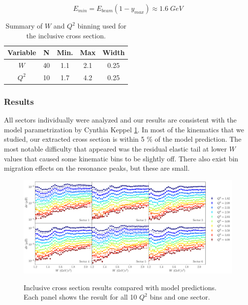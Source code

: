 \begin{equation}
        E_{min} = E_{beam}(1-y_{max}) \approx 1.6 \; GeV
\end{equation}

\begin{table}
  \centering
  \begin{tabular}{c|c|c|c|c}
    Variable & N & Min. & Max & Width \\
    \hline
    $W$   & 40 & 1.1 & 2.1 & 0.25 \\
    $Q^2$ & 10 & 1.7 & 4.2 & 0.25
  \end{tabular}
  \caption{Summary of $W$ and $Q^2$ binning used for the inclusive cross section.}
\end{table}

\subsubsection*{Results}
All sectors individually were analyzed and our results are consistent with the model parametrization by Cynthia Keppel \ref{fig:inclusive_xs}.  In most of the kinematics that we studied, our extracted cross section is within 5 \% of the model prediction.  The most notable difficulty that appeared was the residual elastic tail at lower $W$ values that caused some kinematic bins to be slightly off.  There also exist bin migration effects on the resonance peaks, but these are small.

\begin{figure}
	\begin{center}
		\label{fig:inclusive_xs}
		\includegraphics[width=\textwidth]{image/plots/inclusive/inclusive_xs.pdf}	
		\caption{Inclusive cross section results compared with model predictions.  Each panel shows the result for all 10 $Q^2$ bins and one sector.}
	\end{center}
\end{figure}

